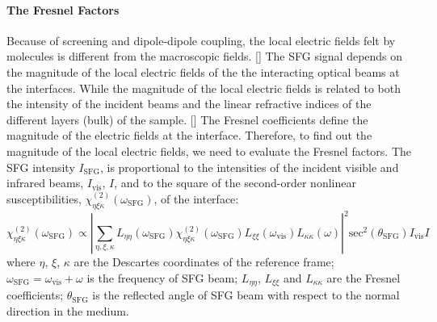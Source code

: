 \paragraph{The Fresnel Factors}
Because of screening and dipole-dipole coupling, the local electric fields felt by molecules is different from the macroscopic fields. [\cite{Vanselow12}] 
The SFG signal depends on the magnitude of the local electric fields  of the the interacting optical beams at the interfaces. 
While the magnitude of the local electric fields is related to both the intensity of the incident beams and the linear refractive indices 
of the different layers (bulk) of the sample.  [\cite{Khatib16}] The Fresnel coefficients define the magnitude of the electric fields at the interface. 
Therefore, to find out the magnitude of the local electric fields, we need to evaluate the Fresnel factors. 
The SFG intensity $I_{\text{SFG}}$, is proportional to the intensities of the incident visible and infrared beams, $I_{\text{vis}}$, $I$, 
and to the square of the second-order nonlinear susceptibilities,
$\chi_{\eta\xi\kappa}^{(2)}(\omega_{\text{SFG}})$, of the interface:
\begin{equation}
        \chi_{\eta\xi\kappa}^{(2)}(\omega_{\text{SFG}})\propto|\sum_{\eta,\xi,\kappa}L_{\eta\eta}(\omega_{\text{SFG}})\chi_{\eta\xi\kappa}^{(2)}(\omega_{\text{SFG}})L_{\xi\xi}(\omega_{\text{vis}})L_{\kappa\kappa}(\omega)|^2\text{sec}^2(\theta_{\text{SFG}})I_{\text{vis}}I
\label{eq:chi}
\end{equation}
where $\eta$, $\xi$, $\kappa$ are the Descartes coordinates of the reference frame;
$\omega_{\text{SFG}}=\omega_{\text{vis}}+\omega$ is the frequency of SFG beam; 
$L_{\eta\eta}$, $L_{\xi\xi}$ and $L_{\kappa\kappa}$ are the Fresnel coefficients; 
$\theta_{\text{SFG}}$ is the reflected angle of SFG beam with respect to the normal 
direction in the medium.

